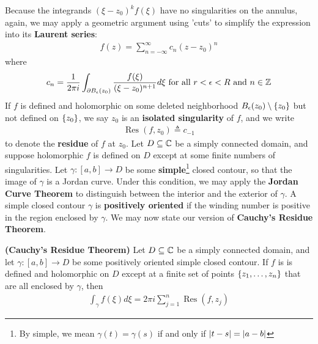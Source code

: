 \documentclass{report}
\begin{document}
Because the integrands $(\xi -z_0)^kf(\xi)$ have no singularities on the annulus, again, we may apply a geometric argument using 'cuts' to simplify the expression into its \textbf{Laurent series}:
\begin{align*}
  f(z)= \sum_{n=-\infty}^{\infty}c_n (z-z_0)^n
\end{align*}
where
\begin{align}
\label{cnp}
c_n= \frac{1}{2\pi i} \int_{\partial B_\epsilon (z_0)} \frac{f(\xi)}{(\xi - z_0)^{n+1}}d\xi \text{ for all } r<\epsilon  <R \text{ and }n\in\mathbb{Z}
\end{align}
If $f$ is defined and holomorphic on some deleted neighborhood $B_\epsilon (z_0)\setminus \{ z_0 \}$ but not defined on $\{ z_0 \}$, we say $z_0$ is an  \textbf{isolated singularity} of $f$, and we write 
\begin{align*}
\operatorname{Res}(f,z_0)\triangleq c_{-1}
\end{align*}
to denote the \textbf{residue} of $f$ at $z_0$. Let $D\subseteq \mathbb{C}$ be a simply connected domain, and suppose holomorphic $f$ is defined on $D$ except at some finite numbers of singularities. Let $\gamma :[a,b]\rightarrow D$ be some \textbf{simple}\footnote{By simple, we mean  $\gamma (t)=\gamma (s)$ if and only if $\left|t-s\right|=\left|a-b\right|$} closed contour, so that the image of $\gamma $ is a Jordan curve. Under this condition, we may apply the \textbf{Jordan Curve Theorem} to distinguish between the interior and the exterior of $\gamma $. A simple closed contour $\gamma $ is \textbf{positively oriented} if the winding number is positive in the region enclosed by $\gamma $. We may now state our version of \textbf{Cauchy's Residue Theorem}. 
\begin{theorem}
\textbf{(Cauchy's Residue Theorem)}  Let $D\subseteq \mathbb{C}$ be a simply connected domain, and let $\gamma :[a,b]\rightarrow D$ be some positively oriented simple closed contour. If $f$ is is defined and holomorphic on  $D$ except at a finite set of points $\{ z_1,\dots ,z_n \}$ that are all enclosed by $\gamma $, then 
\begin{align*}
\int_\gamma f(\xi)d\xi = 2\pi  i\sum_{j=1}^n \operatorname{Res}(f,z_j) 
\end{align*}
\end{theorem}
\end{document}

